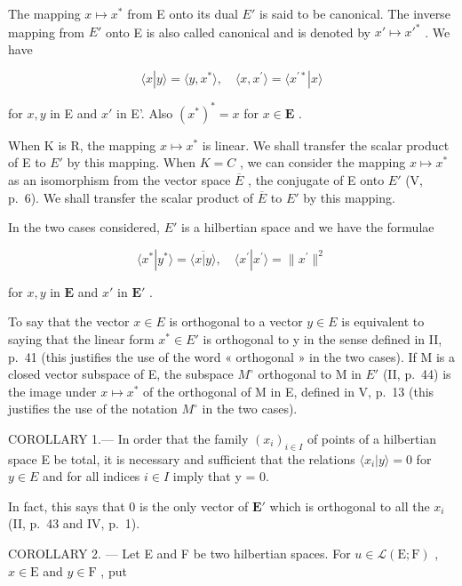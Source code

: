 The mapping \(x \mapsto x^{*}\) from E onto its dual \(E'\) is said to be canonical. The inverse mapping from \(E'\) onto E is also called canonical and is denoted by \(x' \mapsto x'^{*}\) . We have

\[
\langle x | y \rangle = \langle y, x ^ {*} \rangle , \quad \langle x, x ^ {\prime} \rangle = \langle x ^ {\prime *} | x \rangle\tag{17}
\]

for \(x, y\) in E and \(x'\) in E'. Also \((x^{*})^{*} = x\) for \(x \in \mathbf{E}\) .

When K is R, the mapping \(x \mapsto x^{*}\) is linear. We shall transfer the scalar product of E to \(E'\) by this mapping. When \(K = C\) , we can consider the mapping \(x \mapsto x^{*}\) as an isomorphism from the vector space \(\overline{E}\) , the conjugate of E onto \(E'\) (V, p.~6). We shall transfer the scalar product of \(\overline{E}\) to \(E'\) by this mapping.

In the two cases considered, \(E'\) is a hilbertian space and we have the formulae

\[
\langle x ^ {*} | y ^ {*} \rangle = \overline {{\langle x | y \rangle}}, \quad \langle x ^ {\prime} | x ^ {\prime} \rangle = \| x ^ {\prime} \| ^ {2}
\]

for \(x, y\) in \(\mathbf{E}\) and \(x'\) in \(\mathbf{E}'\) .

To say that the vector \(x \in E\) is orthogonal to a vector \(y \in E\) is equivalent to saying that the linear form \(x^{*} \in E'\) is orthogonal to y in the sense defined in II, p.~41 (this justifies the use of the word « orthogonal » in the two cases). If M is a closed vector subspace of E, the subspace \(M^{\circ}\) orthogonal to M in \(E'\) (II, p.~44) is the image under \(x \mapsto x^{*}\) of the orthogonal of M in E, defined in V, p.~13 (this justifies the use of the notation \(M^{\circ}\) in the two cases).

COROLLARY 1.--- In order that the family \((x_{i})_{i\in I}\) of points of a hilbertian space E be total, it is necessary and sufficient that the relations \(\langle x_{i}|y\rangle = 0\) for \(y \in E\) and for all indices \(i \in I\) imply that y = 0.

In fact, this says that 0 is the only vector of \(\mathbf{E}'\) which is orthogonal to all the \(x_{i}\) (II, p.~43 and IV, p.~1).

COROLLARY 2. --- Let E and F be two hilbertian spaces. For \(u \in \mathcal{L}(\mathrm{E};\mathrm{F})\) , \(x \in \mathrm{E}\) and \(y \in \mathrm{F}\) , put

